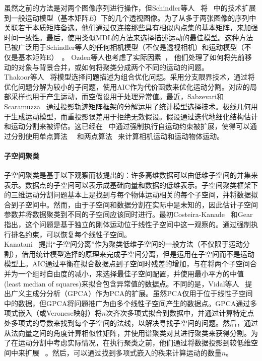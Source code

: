 虽然之前的方法是对两个图像序列进行操作，但Schindler等人~\cite{schindler2006perspective}
将~\cite{schindler2005two}
中的技术扩展到一般运动模型（基本矩阵$E$）下的几个透视图像。为了从多于两张图像的序列中关联若干本质矩阵备选，他们通过仅连接那些具有相似内点集的基本矩阵，来加强时间一致性。最后，使用类似MDL的方法来选择描述运动的最佳模型。这种方法已被广泛用于Schindler等人的任何相机模型（不仅是透视相机）和运动模型（不仅是基本矩阵E）~\cite{schindler2008model}。
Ozden等人也考虑了实际因素~\cite{ozden2010multibody}，
他们处理了如何将先前移动的对象与背景合并，或如何将聚类分成两个不同的运动的问题。\\

Thakoor等人~\cite{thakoor2010multibody}
将模型选择问题描述为组合优化问题。采用分支限界技术，通过将优化问题分解为较小的子问题，使用AIC作为代价函数来优化运动分割。对应的局部采样也用于产生运动，而空假设用于处理异常值。最近，Sabzevari和Scaramuzza~\cite{sabzevari2014monocular}
通过投影轨迹矩阵框架的分解运用了统计模型选择技术。极线几何用于生成运动模型，而重投影误差用于拒绝无效假设。假设通过迭代地细化结构估计和运动分割来被评估。这已经在~\cite{sabzevari2016multi}
中通过强制执行自运动约束被扩展，使得可以通过分别使用单点算法~\cite{scaramuzza20111}~\cite{scaramuzza2009real}
和两点算法~\cite{ortin2001indoor}
来计算相机运动和运动物体运动。\\


\paragraph{子空间聚类}
子空间聚类是基于以下观察而被提出的：许多高维数据可以由低维子空间的并集来表示。数据点的子空间可以表示成基础向量和数据的低维表示。子空间聚类框架下的三维运动分割问题基本上是找到与每个物体运动相关的每个子空间，并将数据拟合到子空间中。然而，由于子空间和数据分割在实际中是未知的，因此估计子空间参数并将数据聚类到不同的子空间应该同时进行。最初Costeira-Kanade~\cite{costeira1998multibody}
和Gear~\cite{gear1998multibody}
指出，这个问题是基于独立的刚体运动位于线性子空间中这一观察的。通过强制执行排名约束，可以恢复每个线性子空间。\\

Kanatani~\cite{kanatani2001motion}
提出“子空间分离”作为聚类低维子空间的一般方法（不仅限于运动分割），借用统计模型选择的原理来完成子空间分离，但是运用在子空间而不是运动模型上。AIC通过平衡在拟合数据点到子空间时残差的增加，与在将两个子空间合并为一个组时自由度的减小，来选择最佳子空间配置，并使用最小平方的中值(least median of squares)来拟合包含异常值的数据点。不同的是，Vidal等人~\cite{vidal2005generalized}
提出广义主成分分析（GPCA）作为PCA的扩展。虽然PCA仅用于位于线性子空间中的数据，但GPCA将问题推广为由多个线性子空间产生的数据点。GPCA通过多项式嵌入（或Veronese映射）将$n$次齐次多项式拟合到数据中，并通过计算特定点处多项式的导数来找到每个子空间的法线，以解决寻找子空间的问题。然后，通过从法向量之间的角度计算相似性矩阵，并使用谱聚类对其进行聚类来获得分割。为了在运动分割中考虑实际情况，在执行聚类之前，他们通过将数据投影到较低维空间中来扩展~\cite{vidal2005generalized}
。然后，可以通过找到多项式嵌入的秩来计算运动的数量$n$。\\

